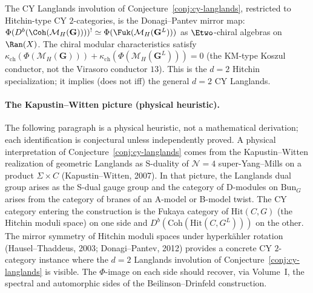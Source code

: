 \begin{conjecture}
\label{conj:cy-langlands-hitchin}
\ClaimStatusConjectured
The CY Langlands involution of Conjecture~\ref{conj:cy-langlands}, restricted to Hitchin-type CY $2$-categories, is the Donagi--Pantev mirror map: $\Phi(D^b(\Coh(\mathcal{M}_H(\mathbf{G}))))^! \simeq \Phi(\Fuk(\mathcal{M}_H(\mathbf{G}^L)))$ as $\Etwo$-chiral algebras on $\Ran(X)$.
The chiral modular characteristics satisfy $\kappa_{\mathrm{ch}}(\Phi(\mathcal{M}_H(\mathbf{G}))) + \kappa_{\mathrm{ch}}(\Phi(\mathcal{M}_H(\mathbf{G}^L))) = 0$ (the KM-type Koszul conductor, not the Virasoro conductor $13$).
This is the $d = 2$ Hitchin specialization; it implies (does not iff) the general $d = 2$ CY Langlands.
\end{conjecture}

\paragraph{The Kapustin--Witten picture (physical heuristic).}
The following paragraph is a physical heuristic, not a mathematical derivation; each identification is conjectural unless independently proved. A physical interpretation of Conjecture~\ref{conj:cy-langlands} comes from the Kapustin--Witten realization of geometric Langlands as S-duality of $\mathcal{N} = 4$ super-Yang--Mills on a product $\Sigma \times C$ (Kapustin--Witten, 2007).
In that picture, the Langlands dual group arises as the S-dual gauge group and the category of D-modules on $\mathrm{Bun}_G$ arises from the category of branes of an A-model or B-model twist.
The CY category entering the construction is the Fukaya category of $\mathrm{Hit}(C, G)$ (the Hitchin moduli space) on one side and $D^b(\mathrm{Coh}(\mathrm{Hit}(C, G^L)))$ on the other.
The mirror symmetry of Hitchin moduli spaces under hyperk\"ahler rotation (Hausel--Thaddeus, 2003; Donagi--Pantev, 2012) provides a concrete CY $2$-category instance where the $d = 2$ Langlands involution of Conjecture~\ref{conj:cy-langlands} is visible.
The $\Phi$-image on each side should recover, via Volume~I, the spectral and automorphic sides of the Beilinson--Drinfeld construction.

